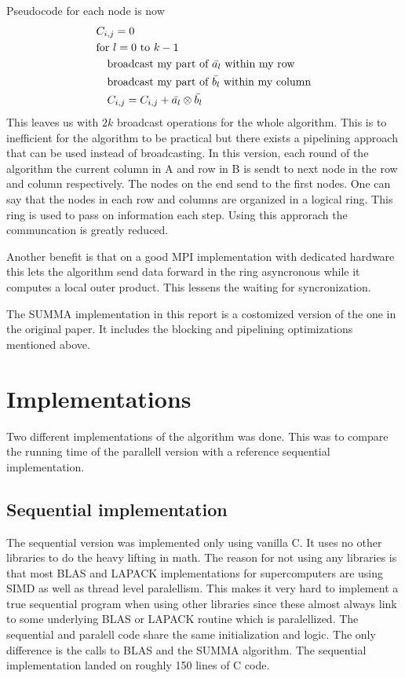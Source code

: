 \documentclass{article}
\begin{document}
Pseudocode for each node is now
\begin{align*}
  &C_{i,j} = 0\\
  &\text{for } l=0 \text{ to } k-1\\
  &\text{\enskip\enskip broadcast my part of } \bar{a_l} \text{ within my row}\\
  &\text{\enskip\enskip broadcast my part of } \bar{b_l} \text{ within my column}\\
  &\text{\enskip\enskip }C_{i,j} = C_{i,j} + \bar{a_l} \otimes \bar{b_l}\\
\end{align*}
This leaves us with $2k$ broadcast operations for the whole algorithm. This is to
inefficient for the algorithm to be practical but there exists a pipelining approach
that can be used instead of broadcasting. In this version, each round of the algorithm
the current column in A and row in B is sendt to next node in the row and column respectively.
The nodes on the end send to the first nodes. One can say that the nodes in each row and columns
are organized in a logical ring. This ring is used to pass on information each step. Using this
approrach the communcation is greatly reduced.

Another benefit is that on a good MPI implementation
with dedicated hardware this lets the algorithm send data forward in the ring asyncronous while
it computes a local outer product. This lessens the waiting for syncronization.

The SUMMA implementation in this report is a costomized version of the one in the original paper\cite{summa}.
It includes the blocking and pipelining optimizations mentioned above.

\section{Implementations}
Two different implementations of the algorithm was done.
This was to compare the running time of the parallell version with a reference
sequential implementation.

\subsection{Sequential implementation}
The sequential version was implemented only using vanilla C. It uses no other libraries to
do the heavy lifting in math. The reason for not using any libraries is that most BLAS and LAPACK
implementations for supercomputers are using SIMD as well as thread level paralellism. This makes
it very hard to implement a true sequential program when using other libraries since these almost always
link to some underlying BLAS or LAPACK routine which is paralellized. The sequential and paralell code
share the same initialization and logic. The only difference is the calls to BLAS and the SUMMA algorithm.
The sequential implementation landed on roughly 150 lines of C code.
\end{document}
